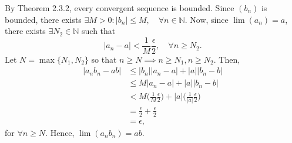 \documentclass{article}
\begin{document}
                By Theorem 2.3.2, every convergent sequence is bounded. Since $(b_n)$ is bounded, there exists $\exists M>0: |b_n| \leq M, \quad \forall n \in \mathbb{N}$. Now, since $\lim (a_n)=a$, there exists $\exists N_2 \in \mathbb{N}$ such that
                \begin{equation*}
                    |a_n - a| < \frac{1}{M} \frac{\epsilon}{2}, \quad \forall n \geq N_2.
                \end{equation*}
                Let $N = \max\{N_1,N_2\}$ so that $n \geq N \implies n \geq N_1, n \geq N_2$. Then, 
                \begin{align*}
                    |a_nb_n-ab| & \leq |b_n||a_n-a|+|a||b_n-b| \\
                    & \leq M|a_n-a| + |a||b_n-b| \\
                    & < M\bigg(\frac{1}{M}\frac{\epsilon}{2}\bigg) + |a|\bigg(\frac{1}{|a|}\frac{\epsilon}{2}\bigg)\\
                    & = \frac{\epsilon}{2} + \frac{\epsilon}{2}\\
                    & = \epsilon,
                \end{align*}
                for $\forall n \geq N$. Hence, $\lim (a_nb_n)=ab$.
                
\end{document}
